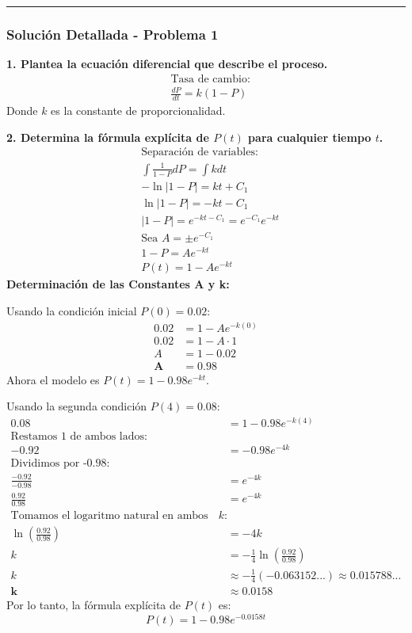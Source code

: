 \documentclass[12pt, a4paper]{article}
\begin{document}
\vspace{1em}
\hrule %
\vspace{1em}

\subsubsection*{Solución Detallada - Problema 1}

\noindent \textbf{1. Plantea la ecuación diferencial que describe el proceso.}
\begin{align*}
&\text{Tasa de cambio:} \\
&\frac{dP}{dt} = k(1-P)
\end{align*}
Donde $k$ es la constante de proporcionalidad.

\vspace{0.5em}
\noindent \textbf{2. Determina la fórmula explícita de $P(t)$ para cualquier tiempo $t$.}
\begin{align*}
&\text{Separación de variables:} \\
&\int \frac{1}{1-P} dP = \int k dt \\
&- \ln|1-P| = kt + C_1 \\
&\ln|1-P| = -kt - C_1 \\
&|1-P| = e^{-kt - C_1} = e^{-C_1}e^{-kt} \\
&\text{Sea } A = \pm e^{-C_1} \\
&1-P = Ae^{-kt} \\
&P(t) = 1 - Ae^{-kt}
\end{align*}
\noindent \textbf{Determinación de las Constantes A y k:}

Usando la condición inicial $P(0) = 0.02$:
\begin{align*}
0.02 &= 1 - Ae^{-k(0)} \\
0.02 &= 1 - A \cdot 1 \\
A &= 1 - 0.02 \\
\boldsymbol{A} &= \boldsymbol{0.98}
\end{align*}
Ahora el modelo es $P(t) = 1 - 0.98e^{-kt}$.

Usando la segunda condición $P(4) = 0.08$:
\begin{align*}
0.08 &= 1 - 0.98e^{-k(4)} \\
\text{Restamos 1 de ambos lados:}\\
-0.92 &= -0.98e^{-4k} \\
\text{Dividimos por -0.98:}\\
\frac{-0.92}{-0.98} &= e^{-4k} \\
\frac{0.92}{0.98} &= e^{-4k} \\
\text{Tomamos el logaritmo natural en ambos lados para despejar } k\text{:} \\
\ln\left(\frac{0.92}{0.98}\right) &= -4k \\
k &= -\frac{1}{4} \ln\left(\frac{0.92}{0.98}\right) \\
k &\approx -\frac{1}{4} (-0.063152...) \approx 0.015788... \\
\boldsymbol{k} &\approx \boldsymbol{0.0158}
\end{align*}
Por lo tanto, la fórmula explícita de $P(t)$ es:
\begin{equation*}
\boxed{P(t) = 1 - 0.98e^{-0.0158t}}
\end{equation*}
\end{document}
